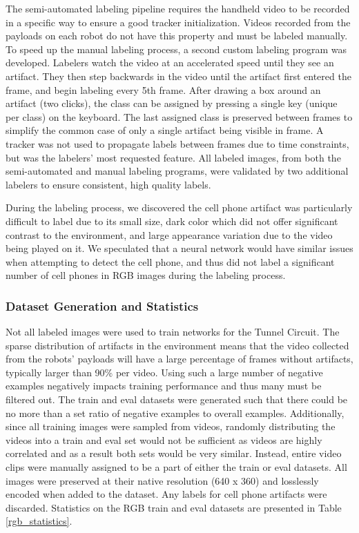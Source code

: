 The semi-automated labeling pipeline requires the handheld video to be recorded in a specific way to ensure a good tracker initialization. Videos recorded from the payloads on each robot do not have this property and must be labeled manually. To speed up the manual labeling process, a second custom labeling program was developed. Labelers watch the video at an accelerated speed until they see an artifact. They then step backwards in the video until the artifact first entered the frame, and begin labeling every 5th frame. After drawing a box around an artifact (two clicks), the class can be assigned by pressing a single key (unique per class) on the keyboard. The last assigned class is preserved between frames to simplify the common case of only a single artifact being visible in frame. A tracker was not used to propagate labels between frames due to time constraints, but was the labelers' most requested feature. All labeled images, from both the semi-automated and manual labeling programs, were validated by two additional labelers to ensure consistent, high quality labels.

During the labeling process, we discovered the cell phone artifact was particularly difficult to label due to its small size, dark color which did not offer significant contrast to the environment, and large appearance variation due to the video being played on it. We speculated that a neural network would have similar issues when attempting to detect the cell phone, and thus did not label a significant number of cell phones in RGB images during the labeling process.

\subsubsection{Dataset Generation and Statistics}

Not all labeled images were used to train networks for the Tunnel Circuit. The sparse distribution of artifacts in the environment means that the video collected from the robots' payloads will have a large percentage of frames without artifacts, typically larger than 90\% per video. Using such a large number of negative examples negatively impacts training performance and thus many must be filtered out. The train and eval datasets were generated such that there could be no more than a set ratio of negative examples to overall examples. Additionally, since all training images were sampled from videos, randomly distributing the videos into a train and eval set would not be sufficient as videos are highly correlated and as a result both sets would be very similar. Instead, entire video clips were manually assigned to be a part of either the train or eval datasets. All images were preserved at their native resolution (640 x 360) and losslessly encoded when added to the dataset. Any labels for cell phone artifacts were discarded. Statistics on the RGB train and eval datasets are presented in Table \ref{rgb_statistics}.

